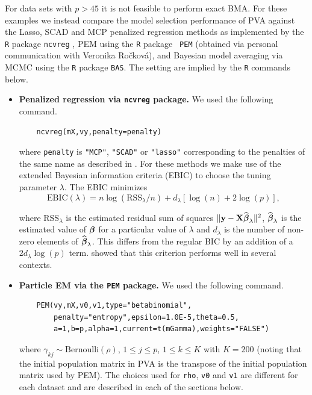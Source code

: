 For data sets with $p>45$ it is not feasible to perform exact BMA.  For these
examples we instead compare the model selection performance of PVA against the
Lasso, SCAD and MCP penalized regression methods as implemented by the {\tt R}
package {\tt ncvreg} \citep{Breheny2011}, PEM using the {\tt R} package {\tt
PEM} (obtained via personal communication with Veronika Ro\v{c}kov\'a), and
Bayesian model averaging via MCMC using the {\tt R} package {\tt BAS}.  The
setting are implied by the {\tt R} commands below.
\begin{itemize}

    \item {\bf Penalized regression via {\tt ncvreg} package.} We used the
        following command.
	\begin{verbatim}
	ncvreg(mX,vy,penalty=penalty)
	\end{verbatim}
	
    \noindent where {\tt penalty} is {\tt "MCP"}, {\tt "SCAD"} or {\tt "lasso"}
    corresponding to the penalties of the same name as described in
    \cite{Breheny2011}.  For these methods we make use of the extended Bayesian
    information criteria (EBIC) \citep{Chen2008} to choose the tuning parameter
    $\lambda$. The EBIC minimizes
	$$
	\mbox{EBIC}(\lambda) = n\log(\mbox{RSS}_\lambda/n) + d_\lambda
	\left[ \log(n) + 2\log(p) \right],
	$$
	
    \noindent where $\mbox{RSS}_\lambda$ is the estimated residual sum of
    squares $\|{\bf y} - {\bf X}\widehat{{\boldsymbol \beta}}_\lambda\|^2$,
    $\widehat{{\boldsymbol \beta}}_\lambda$ is the estimated value of ${\boldsymbol \beta}$ for a
    particular value of $\lambda$ and $d_\lambda$ is the number of non-zero
    elements of $\widehat{{\boldsymbol \beta}}_\lambda$.  This differs from the regular BIC
    by an addition of a $2 d_\lambda \log(p)$ term.  \cite{Wang2007} showed
    that this criterion performs well in several contexts.
	
    \item {\bf Particle EM via the {\tt PEM} package.} We used the following
        command.
	\begin{verbatim}
	PEM(vy,mX,v0,v1,type="betabinomial", 
	    penalty="entropy",epsilon=1.0E-5,theta=0.5, 
	    a=1,b=p,alpha=1,current=t(mGamma),weights="FALSE")
	\end{verbatim}
	
    \noindent where $\gamma_{kj} \sim \mbox{Bernoulli}(\rho)$, $1\le j\le p$,
    $1\le k\le K$ with $K=200$ (noting that the initial population matrix in
    PVA is the transpose of the initial population matrix used by PEM). The
    choices used for {\tt rho}, {\tt v0} and {\tt v1} are different for each
    dataset and are described in each of the sections below.
	

\end{itemize}

